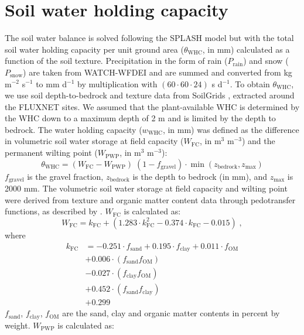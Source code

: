 \documentclass[gmd, manuscript]{copernicus}
\begin{document}
\section{Soil water holding capacity}
\label{sec:whc}
The soil water balance is solved following the SPLASH model but with the total soil water holding capacity per unit ground area ($\theta_\text{WHC}$, in mm) calculated as a function of the soil texture. Precipitation in the form of rain ($P_{\text{rain}}$) and snow ($P_{\text{snow}}$) are taken from WATCH-WFDEI \citep{Weedon2014-nv} and are summed and converted from kg m$^{-2}$ s$^{-1}$ to mm d$^{-1}$ by multiplication with $(60 \cdot 60 \cdot 24)$ s d$^{-1}$. To obtain $\theta_\text{WHC}$, we use soil depth-to-bedrock and texture data from SoilGrids \citep{Hengl2014-jm}, extracted around the FLUXNET sites. We assumed that the plant-available WHC is determined by the WHC down to a maximum depth of 2 m and is limited by the depth to bedrock. The water holding capacity ($w_\text{WHC}$, in mm) was defined as the difference in volumetric soil water storage at field capacity ($W_{\text{FC}}$, in m$^3$ m$^{-3}$) and the permanent wilting point ($W_{\text{PWP}}$, in m$^3$ m$^{-3}$):
\begin{equation}
\theta_\text{WHC} = (W_{\text{FC}} - W_{\text{PWP}}) \; (1-f_\text{gravel})\cdot \min(z_\text{bedrock}, z_\text{max})
\end{equation}
$f_\text{gravel}$ is the gravel fraction, $z_\text{bedrock}$ is the depth to bedrock (in mm), and $z_\text{max}$ is 2000 mm. The volumetric soil water storage at field capacity and wilting point were derived from texture and organic matter content data through pedotransfer functions, as described by \citet{saxton06}. $W_{\text{FC}}$ is calculated as:
\begin{equation}
W_{\text{FC}}= k_\text{FC}+(1.283\cdot k_\text{FC}^{2}-0.374\cdot k_\text{FC}-0.015)\;, 
\end{equation}
where
\begin{align}
k_\text{FC} &=-0.251\cdot f_{\text{sand}} + 0.195\cdot f_{\text{clay}} + 0.011\cdot f_{\text{OM}}\\                            
&+ 0.006\cdot (f_{\text{sand}} f_{\text{OM}})\\
&- 0.027\cdot (f_{\text{clay}} f_{\text{OM}})\\
&+ 0.452\cdot (f_{\text{sand}} f_{\text{clay}})\\
&+ 0.299
\end{align}
$f_{\text{sand}}$, $f_{\text{clay}}$, $f_{\text{OM}}$ are the sand, clay and organic matter contents in percent by weight. $W_{\text{PWP}}$ is calculated as:
\end{document}
